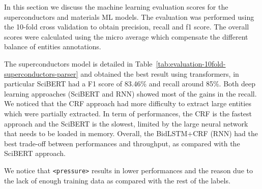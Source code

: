\documentclass{article}
\begin{document}
In this section we discuss the machine learning evaluation scores for the superconductors and materials ML models. The evaluation was performed using the 10-fold cross validation to obtain precision, recall and f1 score. The overall scores were calculated using the micro average which compensate the different balance of entities annotations. 

The superconductors model is detailed in Table~\ref{tab:evaluation-10fold-superconductors-parser} and obtained the best result using transformers, in particular SciBERT had a F1 score of 83.46\% and recall around 85\%. Both deep learning approaches (SciBERT and RNN) showed most of the gains in the recall.
We noticed that the CRF approach had more difficulty to extract large entities which were partially extracted. 
In term of performances, the CRF is the fastest approach and the SciBERT is the slowest, limited by the large neural network that needs to be loaded in memory.
Overall, the BidLSTM+CRF (RNN) had the best trade-off between performances and throughput, as compared with the SciBERT approach. 

We notice that \texttt{<pressure>} results in lower performances and the reason due to the lack of enough training data as compared with the rest of the labels. 

\begin{table}[ht]
\centering
{}
\caption{\label{tab:evaluation-10fold-superconductors-parser} Evaluation scores for the superconductor models using 10-fold cross-validation. }
\end{table}
\end{document}

